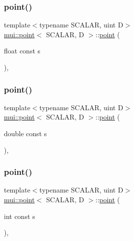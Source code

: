 \mbox{\label{structmui_1_1point_aab70ef541ac82722d7e609c6a7df0aa7}} 
\subsubsection{\texorpdfstring{point()}{point()}\hspace{0.1cm}{\footnotesize\ttfamily [2/15]}}
{\footnotesize\ttfamily template$<$typename S\+C\+A\+L\+AR, uint D$>$ \\
\hyperlink{structmui_1_1point}{mui\+::point}$<$ S\+C\+A\+L\+AR, D $>$\+::\hyperlink{structmui_1_1point}{point} (\begin{DoxyParamCaption}\item[{float const}]{s }\end{DoxyParamCaption})\hspace{0.3cm}{\ttfamily [inline]}, {\ttfamily [explicit]}}

\mbox{\label{structmui_1_1point_ad7ef46b9b3434f02f7405c4b480f7292}} 
\subsubsection{\texorpdfstring{point()}{point()}\hspace{0.1cm}{\footnotesize\ttfamily [3/15]}}
{\footnotesize\ttfamily template$<$typename S\+C\+A\+L\+AR, uint D$>$ \\
\hyperlink{structmui_1_1point}{mui\+::point}$<$ S\+C\+A\+L\+AR, D $>$\+::\hyperlink{structmui_1_1point}{point} (\begin{DoxyParamCaption}\item[{double const}]{s }\end{DoxyParamCaption})\hspace{0.3cm}{\ttfamily [inline]}, {\ttfamily [explicit]}}

\mbox{\label{structmui_1_1point_a40a3e5bc095d10f264f8c28c4479c621}} 
\subsubsection{\texorpdfstring{point()}{point()}\hspace{0.1cm}{\footnotesize\ttfamily [4/15]}}
{\footnotesize\ttfamily template$<$typename S\+C\+A\+L\+AR, uint D$>$ \\
\hyperlink{structmui_1_1point}{mui\+::point}$<$ S\+C\+A\+L\+AR, D $>$\+::\hyperlink{structmui_1_1point}{point} (\begin{DoxyParamCaption}\item[{int const}]{s }\end{DoxyParamCaption})\hspace{0.3cm}{\ttfamily [inline]}, {\ttfamily [explicit]}}

